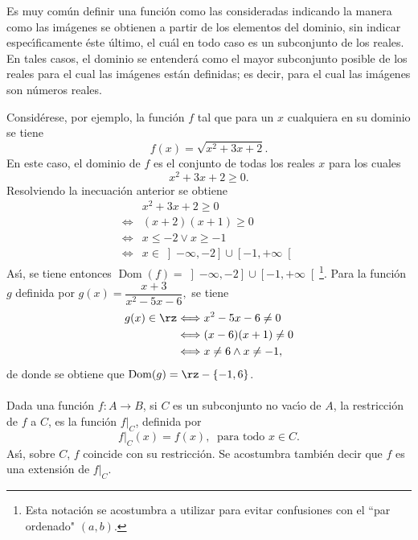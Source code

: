 Es muy com\'{u}n definir una funci\'{o}n como las consideradas indicando la
manera como las im\'{a}genes se obtienen a partir de los elementos del
dominio, sin indicar espec\'{\i}ficamente \'{e}ste \'{u}ltimo, el cu\'{a}l en
todo caso es un subconjunto de los reales. En tales casos, el dominio se
entender\'{a} como el mayor subconjunto posible de los reales para el cual las
im\'{a}genes est\'{a}n definidas; es decir, para el cual las im\'{a}genes son
n\'{u}meros reales.

\begin{example}
Consid\'{e}rese, por ejemplo, la funci\'{o}n $f$ tal que para un $x$
cualquiera en su dominio se tiene
\[
f(x)=\sqrt{x^{2}+3x+2}.
\]
En este caso, el dominio de $f$ es el conjunto de todas los reales $x$ para
los cuales
\[
x^{2}+3x+2\geq0.
\]
Resolviendo la inecuaci\'{o}n anterior se obtiene
\begin{align*}
&  x^{2}+3x+2\geq0\\
\Longleftrightarrow &  (x+2)(x+1)\geq0\\
\Longleftrightarrow &  x\leq-2\vee x\geq-1\\
\Longleftrightarrow &  x\in\left]  -\infty,-2\right]  \cup\left[
-1,+\infty\right[
\end{align*}
As\'{\i}, se tiene entonces $\operatorname*{Dom}(f)=\left]  -\infty,-2\right]
\cup\left[  -1,+\infty\right[  $\footnote{Esta notaci\'{o}n se acostumbra a
utilizar para evitar confusiones con el \textquotedblleft par ordenado"
$(a,b)$.}. Para la funci\'{o}n $g$ definida por $g(x)=\dfrac{x+3}{x^{2}%
-5x-6},$ se tiene
\begin{align*}
g(x)\in\rz &  \Longleftrightarrow x^{2}-5x-6\neq0\\
&  \Longleftrightarrow(x-6)(x+1)\neq0\\
&  \Longleftrightarrow x\neq6\wedge x\neq-1,
\end{align*}
de donde se obtiene que $\operatorname*{Dom}(g)=\rz-\{-1,6\}$.
\end{example}

\paragraph{}

Dada una funci\'{o}n $f:A\longrightarrow B$, si $C$ es un subconjunto no
vac\'{\i}o de $A$, la restricci\'{o}n de%
$f$ a $C$, es la funci\'{o}n $f|_{C}$, definida por
\begin{equation}
f|_{C}(x)=f(x),\ \mbox{ \ para todo \ }x\in C. \label{restriccion}%
\end{equation}
As\'{\i}, sobre $C$, $f$ coincide con su restricci\'{o}n. Se acostumbra
tambi\'{e}n decir que $f$ es una extensi\'{o}n de $f|_{C}$.

